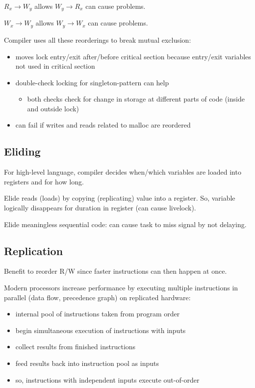 \documentclass[11pt]{article}
\begin{document}
\(R_{x} \to W_{y}\) allows \(W_{y} \to R_{x}\) can cause problems.

\(W_{x} \to W_{y}\) allows \(W_{y} \to W_{x}\) can cause problems.

Compiler uses all these reorderings to break mutual exclusion:
\begin{itemize}
\item moves lock entry/exit after/before critical section because entry/exit variables not used
in critical section
\item double-check locking for singleton-pattern can help
\begin{itemize}
\item both checks check for change in storage at different parts of code (inside and outside lock)
\end{itemize}
\item can fail if writes and reads related to malloc are reordered
\end{itemize}
\subsection{Eliding}
\label{sec:org911c0c0}
For high-level language, compiler decides when/which variables are loaded into registers and for how
long.

Elide reads (loads) by copying (replicating) value into a register.
So, variable logically disappears for duration in register (can cause livelock).

Elide meaningless sequential code: can cause task to miss signal by not delaying.
\subsection{Replication}
\label{sec:org6774570}
Benefit to reorder R/W since faster instructions can then happen at once.

Modern processors increase performance by executing multiple instructions in parallel (data flow,
precedence graph) on replicated hardware:
\begin{itemize}
\item internal pool of instructions taken from program order
\item begin simultaneous execution of instructions with inputs
\item collect results from finished instructions
\item feed results back into instruction pool as inputs
\item so, instructions with independent inputs execute out-of-order
\end{itemize}
\end{document}
